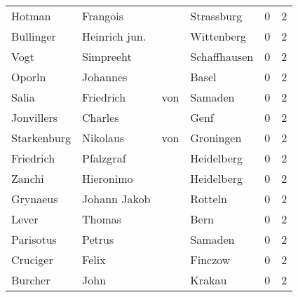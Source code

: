 \begin{tabular}{llllrr}
                   Hotman &                           Frangois &             &                                  Strassburg &          0 &         2 \\
                Bullinger &                      Heinrich jun. &             &                                  Wittenberg &          0 &         2 \\
                     Vogt &                          Simpreeht &             &                                Schaffhausen &          0 &         2 \\
                   Oporln &                           Johannes &             &                                       Basel &          0 &         2 \\
                    Salia &                          Friedrich &         von &                                     Samaden &          0 &         2 \\
               Jonvillers &                            Charles &             &                                        Genf &          0 &         2 \\
              Starkenburg &                           Nikolaus &         von &                                   Groningen &          0 &         2 \\
                Friedrich &                          Pfalzgraf &             &                                  Heidelberg &          0 &         2 \\
                   Zanchi &                          Hieronimo &             &                                  Heidelberg &          0 &         2 \\
                 Grynaeus &                       Johann Jakob &             &                                     Rotteln &          0 &         2 \\
                    Lever &                             Thomas &             &                                        Bern &          0 &         2 \\
                Parisotus &                             Petrus &             &                                     Samaden &          0 &         2 \\
                 Cruciger &                              Felix &             &                                     Finczow &          0 &         2 \\
                  Burcher &                               John &             &                                      Krakau &          0 &         2 \\

\end{tabular}
